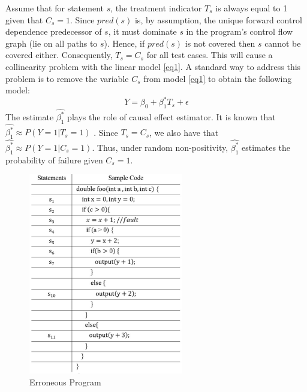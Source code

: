 Assume that for statement $s$, the treatment indicator $T_s$ is always equal to 1 given that $C_s=1$.  
Since $pred(s)$ is, by assumption, the unique forward control dependence predecessor of $s$, 
it must dominate $s$ in the program’s control flow graph (lie on all paths to $s$).  
Hence, if $pred(s)$ is not covered then $s$ cannot be covered either.  Consequently,  $T_s=C_s$ for all test cases. 
This will cause a collinearity problem \cite{wold1984collinearity} with the linear model \eqref{eq1}.  
A standard way to address this problem is to remove the variable $C_s$ from model \eqref{eq1} 
to obtain the following model:
\begin{equation}\label{eq7}
Y=\beta_0+\beta_1^* T_s+\epsilon
\end{equation}
The estimate $\widehat{\beta_1^*}$ plays the role of causal effect estimator.  
It is known that $\widehat {\beta _1^*} \approx P(Y = 1|{T_s} = 1)$ \cite{baah2010causal}.  
Since $T_s=C_s$, we also have that $\widehat {\beta _1^*} \approx P(Y = 1|{C_s} = 1)$.  
Thus, under random non-positivity, $\widehat{\beta_1^*}$ estimates the probability of failure given $C_s=1$.

\begin{figure}[htb!]
\vspace{0em}
\begin{center}
\includegraphics[width=0.6\textwidth]{chapter2_fig2.pdf}
\vspace {0em}\caption{Erroneous Program} \label{fig2.3}
\end{center}
\vspace {0em}
\end{figure}

